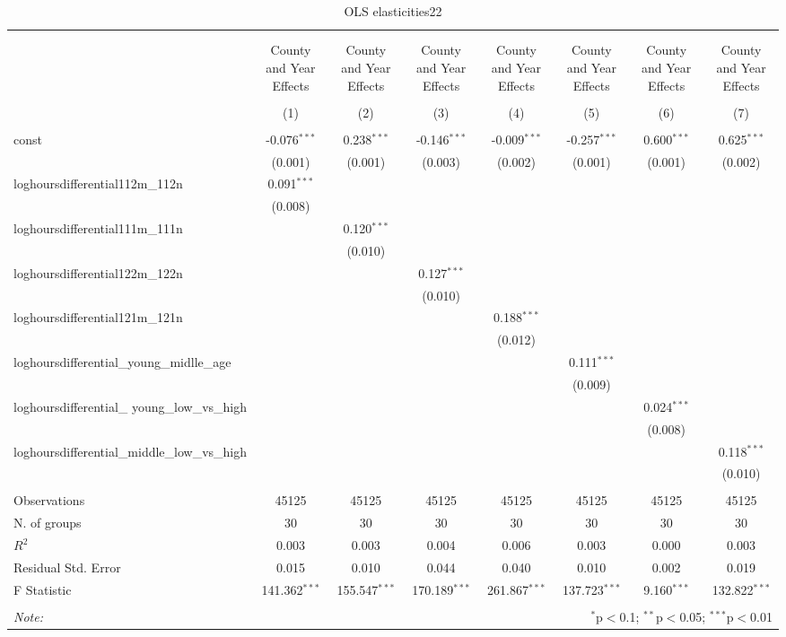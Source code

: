 \documentclass{report}
\begin{document}
\begin{table}[!htbp] \centering
  \caption{OLS elasticities22}
\begin{tabular}{@{\extracolsep{5pt}}lccccccc}
\\[-1.8ex]\hline
\hline \\[-1.8ex]
\\[-1.8ex] & \multicolumn{1}{c}{County and Year Effects} & \multicolumn{1}{c}{County and Year Effects} & \multicolumn{1}{c}{County and Year Effects} & \multicolumn{1}{c}{County and Year Effects} & \multicolumn{1}{c}{County and Year Effects} & \multicolumn{1}{c}{County and Year Effects} & \multicolumn{1}{c}{County and Year Effects}  \\
\\[-1.8ex] & (1) & (2) & (3) & (4) & (5) & (6) & (7) \\
\hline \\[-1.8ex]
 const & -0.076$^{***}$ & 0.238$^{***}$ & -0.146$^{***}$ & -0.009$^{***}$ & -0.257$^{***}$ & 0.600$^{***}$ & 0.625$^{***}$ \\
& (0.001) & (0.001) & (0.003) & (0.002) & (0.001) & (0.001) & (0.002) \\
 loghoursdifferential112m_112n & 0.091$^{***}$ & & & & & & \\
& (0.008) & & & & & & \\
 loghoursdifferential111m_111n & & 0.120$^{***}$ & & & & & \\
& & (0.010) & & & & & \\
 loghoursdifferential122m_122n & & & 0.127$^{***}$ & & & & \\
& & & (0.010) & & & & \\
 loghoursdifferential121m_121n & & & & 0.188$^{***}$ & & & \\
& & & & (0.012) & & & \\
 loghoursdifferential_young_midlle_age & & & & & 0.111$^{***}$ & & \\
& & & & & (0.009) & & \\
 loghoursdifferential_ young_low_vs_high & & & & & & 0.024$^{***}$ & \\
& & & & & & (0.008) & \\
 loghoursdifferential_middle_low_vs_high & & & & & & & 0.118$^{***}$ \\
& & & & & & & (0.010) \\
\hline \\[-1.8ex]
 Observations & 45125 & 45125 & 45125 & 45125 & 45125 & 45125 & 45125 \\
 N. of groups & 30 & 30 & 30 & 30 & 30 & 30 & 30 \\
 $R^2$ & 0.003 & 0.003 & 0.004 & 0.006 & 0.003 & 0.000 & 0.003 \\
 Residual Std. Error & 0.015 & 0.010 & 0.044 & 0.040 & 0.010 & 0.002 & 0.019 \\
 F Statistic & 141.362$^{***}$ & 155.547$^{***}$ & 170.189$^{***}$ & 261.867$^{***}$ & 137.723$^{***}$ & 9.160$^{***}$ & 132.822$^{***}$ \\
\hline
\hline \\[-1.8ex]
\textit{Note:} & \multicolumn{7}{r}{$^{*}$p$<$0.1; $^{**}$p$<$0.05; $^{***}$p$<$0.01} \\
\end{tabular}
\end{table}
\end{document}
